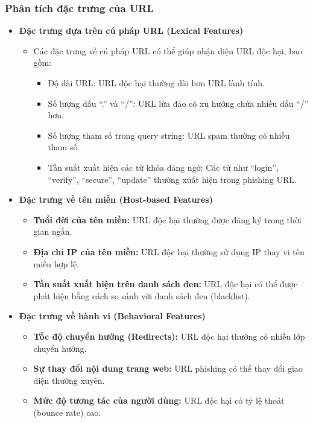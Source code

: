 \documentclass[13pt]{article}
\begin{document}
\subsubsection{Phân tích đặc trưng của URL}
\begin{itemize}
    \item \textbf{Đặc trưng dựa trên cú pháp URL (Lexical Features)}
    \begin{itemize}
        \item Các đặc trưng về cú pháp URL có thể giúp nhận diện URL độc hại, bao gồm:
        \begin{itemize}
            \item Độ dài URL: URL độc hại thường dài hơn URL lành tính.
            \item Số lượng dấu “.” và “/”: URL lừa đảo có xu hướng chứa nhiều dấu “/” hơn.
            \item Số lượng tham số trong query string: URL spam thường có nhiều tham số.
            \item Tần suất xuất hiện các từ khóa đáng ngờ: Các từ như “login”, “verify”, “secure”, “update” thường xuất hiện trong phishing URL.
        \end{itemize}
    \end{itemize}

    \item \textbf{Đặc trưng về tên miền (Host-based Features)}
    \begin{itemize}
        \item \textbf{Tuổi đời của tên miền: } URL độc hại thường được đăng ký trong thời gian ngắn.
        \item \textbf{Địa chỉ IP của tên miền: } URL độc hại thường sử dụng IP thay vì tên miền hợp lệ.
        \item \textbf{Tần suất xuất hiện trên danh sách đen: } URL độc hại có thể được phát hiện bằng cách so sánh với danh sách đen (blacklist).

    \end{itemize}
    \item \textbf{Đặc trưng về hành vi (Behavioral Features)}
    \begin{itemize}
        \item \textbf{Tốc độ chuyển hướng (Redirects): } URL độc hại thường có nhiều lớp chuyển hướng.
        \item \textbf{Sự thay đổi nội dung trang web: } URL phishing có thể thay đổi giao diện thường xuyên.
        \item \textbf{Mức độ tương tác của người dùng: } URL độc hại có tỷ lệ thoát (bounce rate) cao.
    \end{itemize}
\end{itemize}
\end{document}
